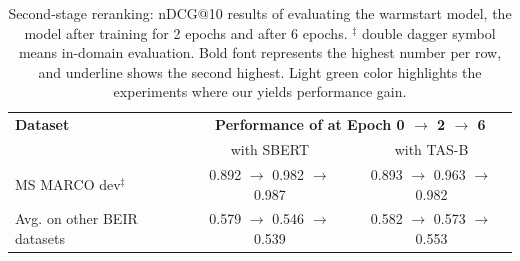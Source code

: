 \documentclass{article}
\begin{document}
\begin{table}[t!] 
    \caption{Second-stage reranking: nDCG@10 results of evaluating the warmstart model, the model after training for 2 epochs and after 6 epochs. $^\ddagger$ double dagger symbol means in-domain evaluation. Bold font represents the highest number per row, and underline shows the second highest. Light green color highlights the experiments where our \alg{} yields performance gain.}
    \vspace{5pt}
    \centering \small
    \begin{tabular}{l c c}
        \toprule
        \textbf{Dataset} & \multicolumn{2}{c}{\textbf{Performance of \alg{} at Epoch 0 $\rightarrow$ 2 $\rightarrow$ 6}} \\
            & with SBERT & with TAS-B \\
        \midrule
MS MARCO dev$^\ddagger$   & 0.892 $\rightarrow$ 0.982 $\rightarrow$ 0.987  & 0.893 $\rightarrow$ 0.963 $\rightarrow$ 0.982 \\
Avg. on other BEIR datasets & 0.579 $\rightarrow$ 0.546 $\rightarrow$ 0.539 & 0.582 $\rightarrow$ 0.573 $\rightarrow$ 0.553 \\
        \bottomrule
    \end{tabular}
    \vspace{-10pt}
    \label{tab:eval_rerank_epoch_comparison}
\end{table}
\end{document}
